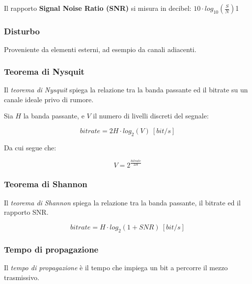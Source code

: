            Il rapporto \textbf{Signal Noise Ratio (SNR)} si misura in decibel:
            \begin{math}
                10 \cdot log_{10} \left( \frac{S}{N}\right)
            \end{math}1
        
        \subsubsection{Disturbo}
            Proveniente da elementi esterni, ad esempio da canali adiacenti.

        \subsubsection{Teorema di Nysquit}
            Il \textit{teorema di Nysquit} spiega la relazione tra la banda passante ed il bitrate su un canale ideale privo di rumore.

            Sia $H$ la banda passante, e $V$ il numero di livelli discreti del segnale:

            \begin{equation*}
                bitrate = 2H \cdot log_2(V) ~ [bit/s]
            \end{equation*}

            Da cui segue che:

            \begin{equation*}
                V = 2^{\frac{bitrate}{2H}}
            \end{equation*}

        \subsubsection{Teorema di Shannon}
            Il \textit{teorema di Shannon} spiega la relazione tra la banda passante, il bitrate ed il rapporto SNR.

            \begin{equation*}
                bitrate = H \cdot log_2(1 + SNR) ~ [bit/s]
            \end{equation*}

        \subsubsection{Tempo di propagazione}
            Il \textit{tempo di propagazione} è il tempo che impiega un bit a percorre il mezzo trasmissivo.

